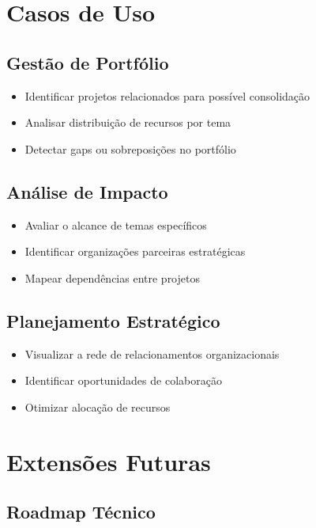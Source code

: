 \documentclass[12pt,a4paper]{article}
\begin{document}
\section{Casos de Uso}

\subsection{Gestão de Portfólio}

\begin{itemize}
    \item Identificar projetos relacionados para possível consolidação
    \item Analisar distribuição de recursos por tema
    \item Detectar gaps ou sobreposições no portfólio
\end{itemize}

\subsection{Análise de Impacto}

\begin{itemize}
    \item Avaliar o alcance de temas específicos
    \item Identificar organizações parceiras estratégicas
    \item Mapear dependências entre projetos
\end{itemize}

\subsection{Planejamento Estratégico}

\begin{itemize}
    \item Visualizar a rede de relacionamentos organizacionais
    \item Identificar oportunidades de colaboração
    \item Otimizar alocação de recursos
\end{itemize}

\section{Extensões Futuras}

\subsection{Roadmap Técnico}
\end{document}
